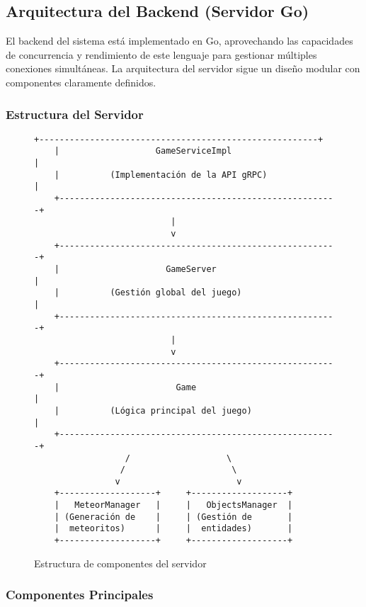 \documentclass[12pt,letterpaper]{article}
\begin{document}
\subsection{Arquitectura del Backend (Servidor Go)}

El backend del sistema está implementado en Go, aprovechando las capacidades de concurrencia y rendimiento de este lenguaje para gestionar múltiples conexiones simultáneas. La arquitectura del servidor sigue un diseño modular con componentes claramente definidos.

\subsubsection{Estructura del Servidor}

\begin{figure}[H]
    \centering
    \begin{lstlisting}[language=text]
    +-------------------------------------------------------+
    |                   GameServiceImpl                     |
    |          (Implementación de la API gRPC)              |
    +-------------------------------------------------------+
                           |
                           v
    +-------------------------------------------------------+
    |                     GameServer                        |
    |          (Gestión global del juego)                   |
    +-------------------------------------------------------+
                           |
                           v
    +-------------------------------------------------------+
    |                       Game                            |
    |          (Lógica principal del juego)                 |
    +-------------------------------------------------------+
                  /                   \
                 /                     \
                v                       v
    +-------------------+     +-------------------+
    |   MeteorManager   |     |   ObjectsManager  |
    | (Generación de    |     | (Gestión de       |
    |  meteoritos)      |     |  entidades)       |
    +-------------------+     +-------------------+
    \end{lstlisting}
    \caption{Estructura de componentes del servidor}
\end{figure}

\subsubsection{Componentes Principales}
\end{document}
